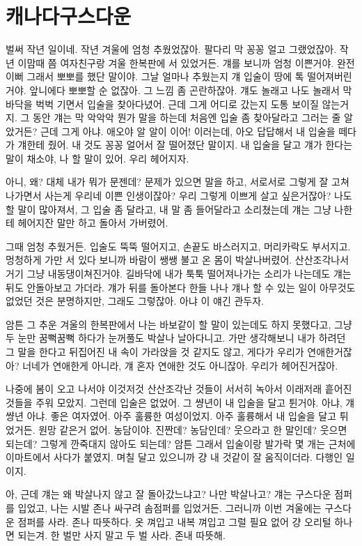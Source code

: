 \documentclass[12pt, b6paper, openany]{memoir}
\newenvironment{article}{}{}
\begin{document}
\begin{article}
\hypertarget{uxce90uxb098uxb2e4uxad6cuxc2a4uxb2e4uxc6b4}{%

\chapter{캐나다구스다운}\label{uxce90uxb098uxb2e4uxad6cuxc2a4uxb2e4uxc6b4}}



벌써 작년 일이네. 작년 겨울에 엄청 추웠었잖아. 팔다리 막 꽁꽁 얼고 그랬었잖아. 작년 이맘때 쯤 여자친구랑 겨울 한복판에 서 있었거든. 걔를 보니까 엄청 이쁜거야. 완전 이뻐 그래서 뽀뽀를 했단 말이야. 그날 얼마나 추웠는지 걔 입술이 땅에 톡 떨어져버린거야. 앞니에다 뽀뽀할 순 없잖아. 그 느낌 좀 곤란하잖아. 걔도 놀래고 나도 놀래서 막 바닥을 벅벅 기면서 입술을 찾아다녔어. 근데 그게 어디로 갔는지 도통 보이질 않는거지. 그 동안 걔는 막 악악악 뭔가 말을 하는데 처음엔 입술 좀 찾아달라고 그러는 줄 알았거든? 근데 그게 아냐. 애오야 알 알이 이어! 이러는데, 아오 답답해서 내 입술을 떼다가 걔한테 줬어. 내 것도 꽁꽁 얼어서 잘 떨어졌단 말이지. 내 입술을 달고 걔가 한다는 말이 채소야, 나 할 말이 있어. 우리 헤어지자.



아니, 왜? 대체 내가 뭐가 문젠데? 문제가 있으면 말을 하고, 서로서로 그렇게 잘 고쳐나가면서 사는게 우리네 이쁜 인생이잖아? 우리 그렇게 이쁘게 살고 싶은거잖아? 나도 할 말이 많아져서, 그 입술 좀 달라고, 내 말 좀 들어달라고 소리쳤는데 걔는 그냥 나한테 헤어지잔 말만 하고 돌아서 가버렸어.



그때 엄청 추웠거든. 입술도 뚝뚝 떨어지고, 손끝도 바스러지고, 머리카락도 부서지고. 멍청하게 가만 서 있다 보니까 바람이 쌩쌩 불고 온 몸이 박살나버렸어. 산산조각나서 거기 그냥 내동댕이쳐진거야. 길바닥에 내가 툭툭 떨어져나가는 소리가 나는데도 걔는 뒤도 안돌아보고 가더라. 걔가 뒤를 돌아본다 한들 나나 걔나 할 수 있는 일이 아무것도 없었던 것은 분명하지만, 그래도 그렇잖아. 아냐 이 얘긴 관두자.



암튼 그 추운 겨울의 한복판에서 나는 바보같이 할 말이 있는데도 하지 못했다고, 그냥 두 눈만 꿈뻑꿈뻑 하다가 눈꺼풀도 박살나 날아다니고. 가만 생각해보니 내가 하려던 그 말을 한다고 뒤집어진 내 속이 가라앉을 것 같지도 않고, 게다가 우리가 연애한거잖아? 너네가 연애한게 아니라, 걔 혼자 연애한 것도 아니잖아. 우리가 헤어진거잖아.



나중에 봄이 오고 나서야 이것저것 산산조각난 것들이 서서히 녹아서 이래저래 흩어진 것들을 주워 모았지. 그런데 입술은 없었어. 그 썅년이 내 입술을 달고 튄거야. 아냐, 걔 썅년 아냐. 좋은 여자였어. 아주 훌륭한 여성이었지. 아주 훌륭해서 내 입술을 달고 튀었거든. 원망 같은거 없어. 농담이야. 진짠데? 농담인데? 웃으라고 한 말인데? 웃으면 되는데? 그렇게 깐죽대지 않아도 되는데? 암튼 그래서 입술이랑 발가락 몇 개는 근처에 이마트에서 사다가 붙였지. 며칠 달고 있으니까 걍 내 것같이 잘 움직이더라. 다행인 일이지.



아, 근데 걔는 왜 박살나지 않고 잘 돌아갔느냐고? 나만 박살나고? 걔는 구스다운 점퍼를 입었고, 나는 시발 존나 싸구려 솜점퍼를 입었거든. 그러니까 이번 겨울에는 구스다운 점퍼를 사라. 존나 따뜻하다. 옷 껴입고 내복 껴입고 그럴 필요 없어 걍 오리털 하나면 되는겨. 한 벌만 사지 말고 두 벌 사라. 존내 따뜻해.


\end{article}
	\appendix
	\backmatter
\end{document}
